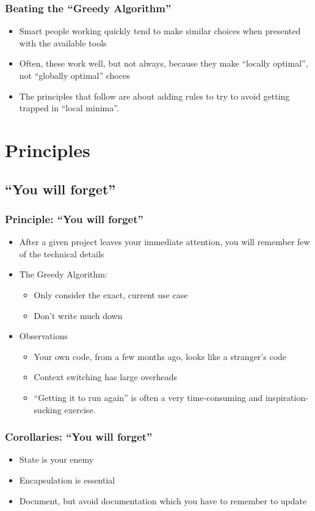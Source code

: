 \documentclass{beamer}
\begin{document}
\begin{frame}[fragile]
\frametitle{Beating the ``Greedy Algorithm''}
\begin{itemize}
  \item Smart people working quickly tend to make similar choices when presented with the available tools
\item Often, these work well, but not always, because they make ``locally optimal'', not ``globally optimal'' choces
\item The principles that follow are about adding rules to try to avoid getting trapped in ``local minima''.
\end{itemize}
\end{frame}

\section{Principles}

\subsection{``You will forget''}
\begin{frame}[fragile]
\frametitle{Principle: ``You will forget''}
\begin{itemize}
\item After a given project leaves your immediate attention, you will remember few of the technical details
\item The Greedy Algorithm:
\begin{itemize}
\item Only consider the exact, current use case
\item Don't write much down
\end{itemize}
\item Observations
\begin{itemize}
\item Your own code, from a few months ago, looks like a stranger's code
\item Context switching has large overheads
\item ``Getting it to run again'' is often a very time-consuming and inspiration-sucking exercise.
\end{itemize}
\end{itemize}
\end{frame}

\begin{frame}[fragile]
\frametitle{Corollaries: ``You will forget''}
  \begin{itemize}
    \item State is your enemy
    \item Encapsulation is essential
    \item Document, but avoid documentation which you have to remember to update
  \end{itemize}
\end{frame}
\end{document}
